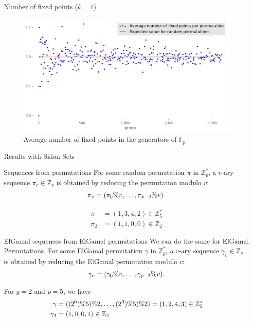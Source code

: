 \begin{frame}{Number of fixed points ($k=1$)}
    \begin{figure}
        \centering
        \includegraphics[width=\textwidth]{figures/average_number_of_fixed_points_per_permutation}
        \caption{Average number of fixed points in the generators of $\mathbb{F}_p$}
        \label{fig:fixedpoints}
    \end{figure}
\end{frame}


\begin{frame}{Results with Sidon Sets}
\end{frame}



\begin{frame}{Sequences from permutations}
    For some random permutation $\pi$ in $\mathbb{Z}_p^*$, a $v$-ary sequence $\pi_v\in\mathbb{Z}_v$ is obtained by reducing the permutation modulo $v$:
    \[
        \pi_v = (\pi_0 \% v, \ldots, \pi_{p-2}\% v).
    \]
    
    \pause
    \begin{align*}
        \pi &= ( 1, 3, 4, 2) \in \mathbb{Z}_5^*\\
        \pi_2 &= (1, 1, 0, 0) \in \mathbb{Z}_2
    \end{align*}
\end{frame}


\begin{frame}{ElGamal sequences from ElGamal permutations}
    We can do the same for ElGamal Permutations. For some ElGamal permutation $\gamma$ in $\mathbb{Z}_p^*$, a $v$-ary sequence $\gamma_v\in\mathbb{Z}_v$ is obtained by reducing the ElGamal permutation modulo $v$:
        \[
            \gamma_v = (\gamma_0 \% v, \ldots, \gamma_{p-2}\% v).
        \]
        
        \pause
        For $g = 2$ and $p = 5$, we have
        \begin{align*}
            \gamma &= ( (2^0) \% 5) \% 2, \ldots, (2^3) \% 5) \% 2) = (1, 2, 4, 3) \in \mathbb{Z}_5^*\\
            \gamma_2 &= (1, 0, 0, 1) \in \mathbb{Z}_2
        \end{align*}
\end{frame}

